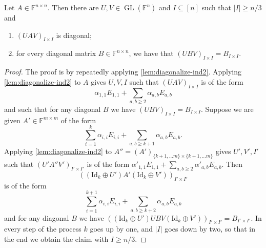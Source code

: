 \documentclass{daj}
\newcommand{\FF}{\mathbb{F}}
\DeclareMathOperator{\GL}{GL}
\newcommand{\id}{\mathrm{Id}}
\begin{document}
\begin{lemma}\label{lem:diagonalize-ind}
    Let $A \in \FF^{n \times n}$. Then there are $U,V \in \GL(\FF^n)$ and $I \subseteq [n]$ such that $|I| \geq n/3$ and 
    \begin{enumerate}[\upshape (i)]
    \item $(UA V)_{I \times I}$ is diagonal;
    \item for every diagonal matrix $B \in \FF^{n \times n}$,  we have that $(U B V)_{I \times I} = B_{I \times I}$.
\end{enumerate}
\end{lemma}
\begin{proof}
    The proof is by repeatedly applying \autoref{lem:diagonalize-ind2}.
    Applying \autoref{lem:diagonalize-ind2} to $A$ gives $U,V,I$ such that $(UAV)_{I \times I}$ is of the form 
    \[
    \alpha_{1,1} E_{1,1} + \sum_{a,b\geq 2} \alpha_{a,b} E_{a,b}
    \]
    and such that for any diagonal $B$ we have $(UBV)_{I \times I} = B_{I \times I}$.
    Suppose we are given $A' \in \FF^{m \times m}$ of the form 
    \[
    \sum_{i=1}^k \alpha_{i,i} E_{i,i} + \sum_{a,b\geq k+1} \alpha_{a,b} E_{a,b}.
    \]
    Applying \autoref{lem:diagonalize-ind2} to $A'' = (A')_{\{k+1, \ldots m\} \times \{k+1, \ldots m\}}$ gives $U', V', I'$ such that $(U' A'' V')_{I' \times I'}$ is of the form $\alpha'_{1,1} E_{1,1} + \sum_{a,b\geq 2} \alpha'_{a,b} E_{a,b}$. Then 
    \[
    ((\id_k\oplus U') A' (\id_k\oplus V'))_{I' \times I'}
    \]
    is of the form 
    \[
    \sum_{i=1}^{k+1} \alpha_{i,i} E_{i,i} + \sum_{a,b\geq k+2} \alpha_{a,b} E_{a,b}
    \]
    and for any diagonal $B$ we have $((\id_k\oplus U')UBV(\id_k\oplus V'))_{I' \times I'} = B_{I' \times I'}$. In every step of the process $k$ goes up by one, and $|I|$ goes down by two, so that in the end we obtain the claim with $I \geq n/3$.
\end{proof}
\end{document}
